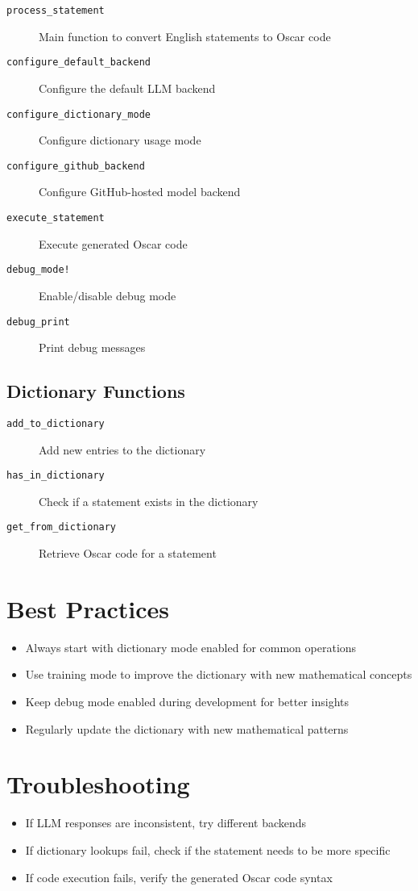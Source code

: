 \documentclass[11pt,a4paper]{article}
\begin{document}
\begin{description}
    \item[\texttt{process\_statement}] Main function to convert English statements to Oscar code
    \item[\texttt{configure\_default\_backend}] Configure the default LLM backend
    \item[\texttt{configure\_dictionary\_mode}] Configure dictionary usage mode
    \item[\texttt{configure\_github\_backend}] Configure GitHub-hosted model backend
    \item[\texttt{execute\_statement}] Execute generated Oscar code
    \item[\texttt{debug\_mode!}] Enable/disable debug mode
    \item[\texttt{debug\_print}] Print debug messages
\end{description}

\subsection{Dictionary Functions}

\begin{description}
    \item[\texttt{add\_to\_dictionary}] Add new entries to the dictionary
    \item[\texttt{has\_in\_dictionary}] Check if a statement exists in the dictionary
    \item[\texttt{get\_from\_dictionary}] Retrieve Oscar code for a statement
\end{description}

\section{Best Practices}

\begin{itemize}
    \item Always start with dictionary mode enabled for common operations
    \item Use training mode to improve the dictionary with new mathematical concepts
    \item Keep debug mode enabled during development for better insights
    \item Regularly update the dictionary with new mathematical patterns
\end{itemize}

\section{Troubleshooting}

\begin{itemize}
    \item If LLM responses are inconsistent, try different backends
    \item If dictionary lookups fail, check if the statement needs to be more specific
    \item If code execution fails, verify the generated Oscar code syntax
\end{itemize}
\end{document}
